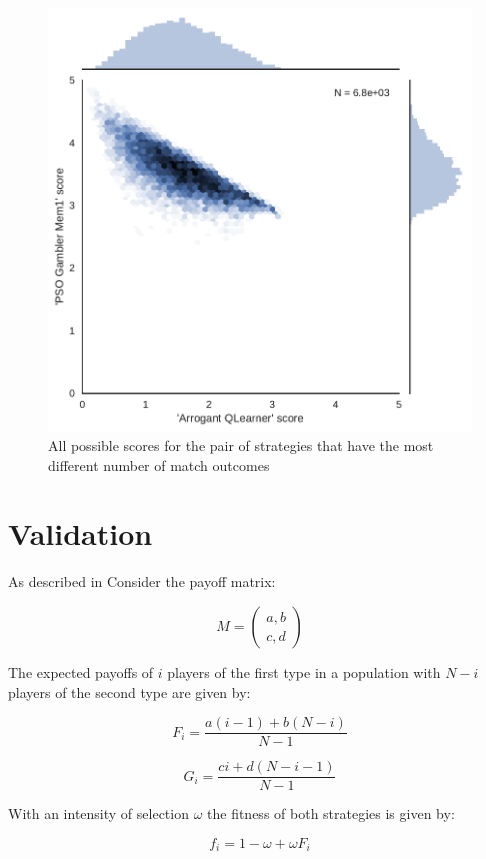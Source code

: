 \documentclass{article}
\begin{document}
{\begin{figure}[!htbp]
    \centering
    \includegraphics[width=.4\textwidth]{../img/players_with_most_scores.pdf}
    \caption{All possible scores for the pair of strategies that have the most
    different number of match outcomes}
    \label{fig:players_with_most_scores}
\end{figure}

\section{Validation}\label{sec:validation}

As described in \cite{Nowak} Consider the payoff matrix:

\begin{equation}\label{equ:payoff_matrix}
    M = \begin{pmatrix}
        a, b\\
        c, d
        \end{pmatrix}
\end{equation}

The expected payoffs of \(i\) players of the first type in a population with \(N
- i\) players of the second type are given by:

\begin{equation}\label{equ:expected_payoff_one}
    F_i = \frac{a(i - 1) + b(N - i)}{N - 1}
\end{equation}

\begin{equation}\label{equ:expected_payoff_two}
    G_i = \frac{ci + d(N - i - 1)}{N - 1}
\end{equation}

With an intensity of selection \(\omega\) the fitness of both strategies is
given by:

\begin{equation}\label{equ:expected_payoff_one}
    f_i = 1 - \omega + \omega F_i
\end{equation}

}
\end{document}
